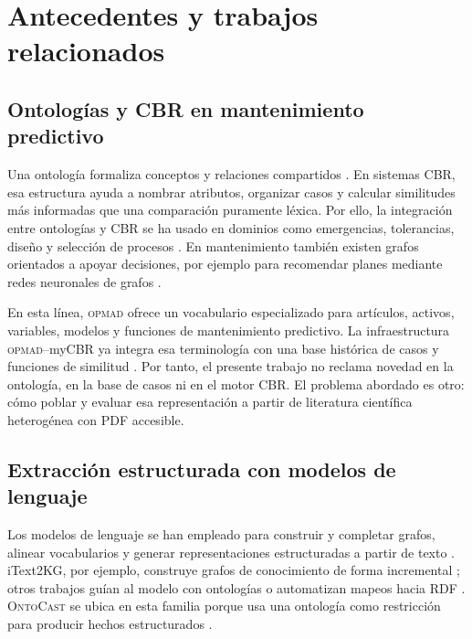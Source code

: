 \documentclass[11pt,a4paper]{article}
\newcommand{\OPMAD}{\textsc{opmad}}
\newcommand{\OntoCast}{\textsc{OntoCast}}
\newcommand{\myCBR}{myCBR}
\begin{document}
\section{Antecedentes y trabajos relacionados}
\label{sec:related}

\subsection{Ontologías y CBR en mantenimiento predictivo}

Una ontología formaliza conceptos y relaciones compartidos \citep{Gruber1993Ontology,NoyMcGuinness2001Ontology101}. En sistemas CBR, esa estructura ayuda a nombrar atributos, organizar casos y calcular similitudes más informadas que una comparación puramente léxica. Por ello, la integración entre ontologías y CBR se ha usado en dominios como emergencias, tolerancias, diseño y selección de procesos \citep{AmailefLu2013OntologyCBR,Qin2018OntologyCBR,RomeroBejarano2014CBRDesign,Mabkhot2019OntologyCBR}. En mantenimiento también existen grafos orientados a apoyar decisiones, por ejemplo para recomendar planes mediante redes neuronales de grafos \citep{Xia2023MaintenanceKG}.

En esta línea, \OPMAD{} ofrece un vocabulario especializado para artículos, activos, variables, modelos y funciones de mantenimiento predictivo. La infraestructura \OPMAD{}--\myCBR{} ya integra esa terminología con una base histórica de casos y funciones de similitud \citep{MonteroJimenez2021OPMADCBR,MunozHernandez2021OntologyCBR}. Por tanto, el presente trabajo no reclama novedad en la ontología, en la base de casos ni en el motor CBR. El problema abordado es otro: cómo poblar y evaluar esa representación a partir de literatura científica heterogénea con PDF accesible.

\subsection{Extracción estructurada con modelos de lenguaje}

Los modelos de lenguaje se han empleado para construir y completar grafos, alinear vocabularios y generar representaciones estructuradas a partir de texto \citep{Pan2024LLMKG}. iText2KG, por ejemplo, construye grafos de conocimiento de forma incremental \citep{Lairgi2024IText2KG}; otros trabajos guían al modelo con ontologías o automatizan mapeos hacia RDF \citep{Mustafa2025OntologyGuided,Marketakis2026RDFMappings}. \OntoCast{} se ubica en esta familia porque usa una ontología como restricción para producir hechos estructurados \citep{Belikov2025OntoCast}.
\end{document}
